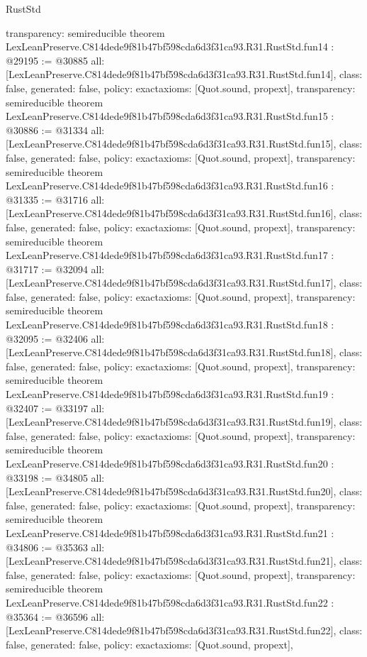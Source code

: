 \begin{lexlean}{RustStd}
\begin{coremodule}
{  transparency: semireducible
}
theorem LexLeanPreserve.C814dede9f81b47bf598cda6d3f31ca93.R31.RustStd.fun14 : @29195 := @30885 {
  all: [LexLeanPreserve.C814dede9f81b47bf598cda6d3f31ca93.R31.RustStd.fun14],
  class: false,
  generated: false,
  policy: exact{axioms: [Quot.sound, propext]},
  transparency: semireducible
}
theorem LexLeanPreserve.C814dede9f81b47bf598cda6d3f31ca93.R31.RustStd.fun15 : @30886 := @31334 {
  all: [LexLeanPreserve.C814dede9f81b47bf598cda6d3f31ca93.R31.RustStd.fun15],
  class: false,
  generated: false,
  policy: exact{axioms: [Quot.sound, propext]},
  transparency: semireducible
}
theorem LexLeanPreserve.C814dede9f81b47bf598cda6d3f31ca93.R31.RustStd.fun16 : @31335 := @31716 {
  all: [LexLeanPreserve.C814dede9f81b47bf598cda6d3f31ca93.R31.RustStd.fun16],
  class: false,
  generated: false,
  policy: exact{axioms: [Quot.sound, propext]},
  transparency: semireducible
}
theorem LexLeanPreserve.C814dede9f81b47bf598cda6d3f31ca93.R31.RustStd.fun17 : @31717 := @32094 {
  all: [LexLeanPreserve.C814dede9f81b47bf598cda6d3f31ca93.R31.RustStd.fun17],
  class: false,
  generated: false,
  policy: exact{axioms: [Quot.sound, propext]},
  transparency: semireducible
}
theorem LexLeanPreserve.C814dede9f81b47bf598cda6d3f31ca93.R31.RustStd.fun18 : @32095 := @32406 {
  all: [LexLeanPreserve.C814dede9f81b47bf598cda6d3f31ca93.R31.RustStd.fun18],
  class: false,
  generated: false,
  policy: exact{axioms: [Quot.sound, propext]},
  transparency: semireducible
}
theorem LexLeanPreserve.C814dede9f81b47bf598cda6d3f31ca93.R31.RustStd.fun19 : @32407 := @33197 {
  all: [LexLeanPreserve.C814dede9f81b47bf598cda6d3f31ca93.R31.RustStd.fun19],
  class: false,
  generated: false,
  policy: exact{axioms: [Quot.sound, propext]},
  transparency: semireducible
}
theorem LexLeanPreserve.C814dede9f81b47bf598cda6d3f31ca93.R31.RustStd.fun20 : @33198 := @34805 {
  all: [LexLeanPreserve.C814dede9f81b47bf598cda6d3f31ca93.R31.RustStd.fun20],
  class: false,
  generated: false,
  policy: exact{axioms: [Quot.sound, propext]},
  transparency: semireducible
}
theorem LexLeanPreserve.C814dede9f81b47bf598cda6d3f31ca93.R31.RustStd.fun21 : @34806 := @35363 {
  all: [LexLeanPreserve.C814dede9f81b47bf598cda6d3f31ca93.R31.RustStd.fun21],
  class: false,
  generated: false,
  policy: exact{axioms: [Quot.sound, propext]},
  transparency: semireducible
}
theorem LexLeanPreserve.C814dede9f81b47bf598cda6d3f31ca93.R31.RustStd.fun22 : @35364 := @36596 {
  all: [LexLeanPreserve.C814dede9f81b47bf598cda6d3f31ca93.R31.RustStd.fun22],
  class: false,
  generated: false,
  policy: exact{axioms: [Quot.sound, propext]},
}
\end{coremodule}
\end{lexlean}
